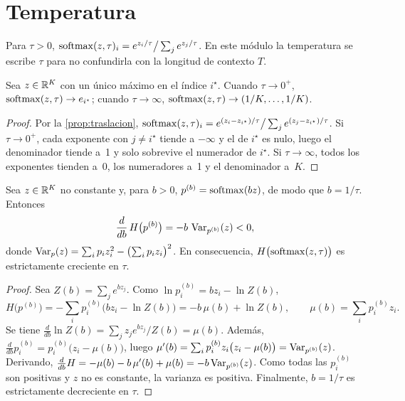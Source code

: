 \section{Temperatura}

\begin{definicion}\label{def:temperatura}
Para $\tau>0$, $\operatorname{softmax}(z,\tau)_i=e^{z_i/\tau}\big/\sum_j e^{z_j/\tau}$. En este módulo la temperatura se escribe $\tau$ para no confundirla con la longitud de contexto $T$.
\end{definicion}

\begin{proposicion}[Límites]\label{prop:limites}
Sea $z\in\mathbb{R}^{K}$ con un único máximo en el índice $i^{\star}$. Cuando $\tau\to 0^{+}$, $\operatorname{softmax}(z,\tau)\to e_{i^{\star}}$; cuando $\tau\to\infty$, $\operatorname{softmax}(z,\tau)\to(1/K,\dots,1/K)$.
\end{proposicion}

\begin{proof}
Por la \cref{prop:traslacion}, $\operatorname{softmax}(z,\tau)_i=e^{(z_i-z_{i^{\star}})/\tau}\big/\sum_j e^{(z_j-z_{i^{\star}})/\tau}$. Si $\tau\to 0^{+}$, cada exponente con $j\ne i^{\star}$ tiende a $-\infty$ y el de $i^{\star}$ es nulo, luego el denominador tiende a~1 y solo sobrevive el numerador de $i^{\star}$. Si $\tau\to\infty$, todos los exponentes tienden a~0, los numeradores a~1 y el denominador a~$K$.
\end{proof}

\begin{teorema}\label{teo:entropia-tau}
Sea $z\in\mathbb{R}^{K}$ no constante y, para $b>0$, $p^{(b)}=\operatorname{softmax}(bz)$, de modo que $b=1/\tau$. Entonces
\[
\frac{d}{db}\,H\bigl(p^{(b)}\bigr)=-b\,\operatorname{Var}_{p^{(b)}}(z)<0,
\]
donde $\operatorname{Var}_{p}(z)=\sum_i p_iz_i^{2}-\bigl(\sum_i p_iz_i\bigr)^{2}$. En consecuencia, $H\bigl(\operatorname{softmax}(z,\tau)\bigr)$ es estrictamente creciente en $\tau$.
\end{teorema}

\begin{proof}
Sea $Z(b)=\sum_j e^{bz_j}$. Como $\ln p^{(b)}_i=bz_i-\ln Z(b)$,
\[
H\bigl(p^{(b)}\bigr)=-\sum_i p^{(b)}_i\bigl(bz_i-\ln Z(b)\bigr)=-b\,\mu(b)+\ln Z(b),\qquad \mu(b)=\sum_i p^{(b)}_iz_i.
\]
Se tiene $\frac{d}{db}\ln Z(b)=\sum_j z_je^{bz_j}/Z(b)=\mu(b)$. Además, $\frac{d}{db}p^{(b)}_i=p^{(b)}_i\bigl(z_i-\mu(b)\bigr)$, luego $\mu'(b)=\sum_i p^{(b)}_iz_i\bigl(z_i-\mu(b)\bigr)=\operatorname{Var}_{p^{(b)}}(z)$. Derivando,
$\frac{d}{db}H=-\mu(b)-b\,\mu'(b)+\mu(b)=-b\operatorname{Var}_{p^{(b)}}(z)$. Como todas las $p^{(b)}_i$ son positivas y $z$ no es constante, la varianza es positiva. Finalmente, $b=1/\tau$ es estrictamente decreciente en $\tau$.
\end{proof}

